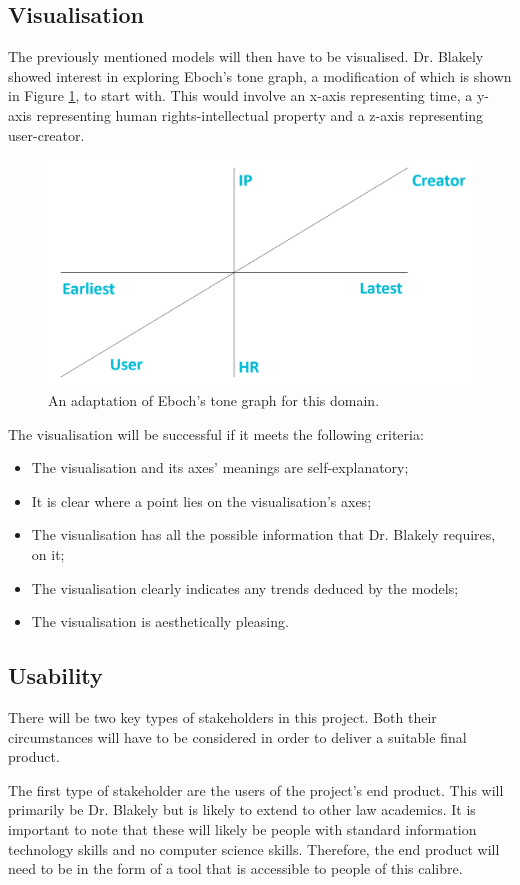 		\subsection{Visualisation}
			The previously mentioned models will then have to be visualised. Dr. Blakely showed interest in exploring Eboch's tone graph\cite{tone_graph_eboch}, a modification of which is shown in Figure \ref{fig:eboch_adapt}, to start with. This would involve an x-axis representing time, a y-axis representing human rights-intellectual property and a z-axis representing user-creator. 
			
			\begin{figure}[h]
    			\centering
    			\includegraphics[width=0.5\linewidth]{resources/images/eboch_adapt.png}
    			\caption{An adaptation of Eboch's tone graph for this domain.}
    			\label{fig:eboch_adapt}
			\end{figure}
			
			The visualisation will be successful if it meets the following criteria:
			\begin{itemize}
				\item The visualisation and its axes' meanings are self-explanatory; 
    			\item It is clear where a point lies on the visualisation's axes; 
    			\item The visualisation has all the possible information that Dr. Blakely requires, on it; 
    			\item The visualisation clearly indicates any trends deduced by the models; 
    			\item The visualisation is aesthetically pleasing. 
			\end{itemize}
			
		\subsection{Usability}
			There will be two key types of stakeholders in this project. Both their circumstances will have to be considered in order to deliver a suitable final product. 

			The first type of stakeholder are the users of the project's end product. This will primarily be Dr. Blakely but is likely to extend to other law academics. It is important to note that these will likely be people with standard information technology skills and no computer science skills. Therefore, the end product will need to be in the form of a tool that is accessible to people of this calibre.  

